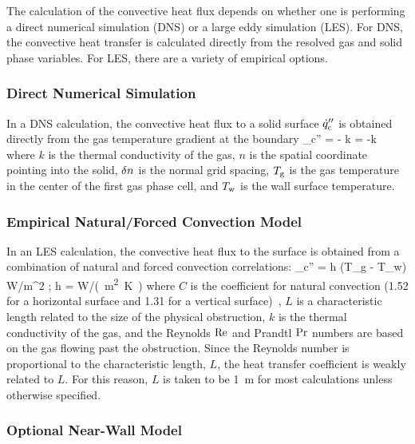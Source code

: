 The calculation of the convective heat flux depends on whether one is performing a direct numerical simulation (DNS) or a large eddy simulation (LES). For DNS, the convective heat transfer is calculated directly from the resolved gas and solid phase variables. For LES, there are a variety of empirical options.

\subsubsection{Direct Numerical Simulation}

In a DNS calculation, the convective heat flux to a solid surface $\dot{q}''_{\rm c}$ is obtained directly from the gas temperature gradient at the boundary
\be
   \dq_{\rm c}'' = - k \;  = -k 
\ee
where $k$ is the thermal conductivity of the gas, $n$ is the spatial coordinate pointing into the solid, $\delta n$ is the normal grid spacing, $T_{\rm g}$ is the gas temperature in the center of the first gas phase cell, and $T_{\rm w}$ is the wall surface temperature.

\subsubsection{Empirical Natural/Forced Convection Model}

In an LES calculation, the convective heat flux to the surface is obtained from a combination of natural and forced convection correlations:
\be \dq_{\rm c}'' = h (T_{\rm g} - T_{\rm w}) \quad \hbox{W/m}^2 \quad ; \quad h =
    \max \;   \quad
    \si{W/(m^2.K)} \ee
where $C$ is the coefficient for natural convection (1.52 for a horizontal surface and 1.31 for a vertical surface)~\cite{Holman:1}, $L$ is a characteristic length related to the size of the physical obstruction, $k$ is the thermal conductivity of the gas, and the Reynolds $\hbox{Re}$ and Prandtl $\hbox{Pr}$ numbers are based on the gas flowing past the obstruction. Since the Reynolds number is proportional to the characteristic length, $L$, the heat transfer coefficient is weakly
related to $L$. For this reason, $L$ is taken to be 1~m for most calculations unless otherwise specified.


\subsubsection{Optional Near-Wall Model}
\label{conflux_wall_model}

